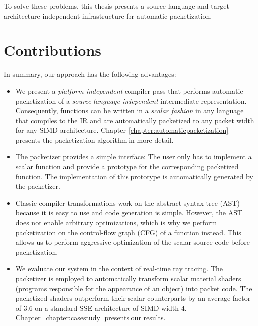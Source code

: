 To solve these problems, this thesis presents a source-language and target-architecture independent infrastructure for automatic packetization.

\section{Contributions}
\label{sec:introduction:contributions}

In summary, our approach has the following advantages:
\begin{itemize}
    \item
        We present a \emph{platform-independent} compiler pass that performs automatic packetization of a \emph{source-language independent} intermediate representation.
        Consequently, functions can be written in a \emph{scalar fashion} in any language that compiles to the IR and are automatically packetized to any packet width for any SIMD architecture.
        Chapter~\ref{chapter:automaticpacketization} presents the packetization algorithm in more detail.
	\item
        The packetizer provides a simple interface:
		The user only has to implement a scalar function and provide a prototype for the corresponding packetized function. %
		The implementation of this prototype is automatically generated by the packetizer.
    \item
        Classic compiler transformations work on the abstract syntax tree (AST) because it is easy to use and code generation is simple.
        However, the AST does not enable arbitrary optimizations, which is why we perform packetization on the control-flow graph (CFG) of a function instead.
        This allows us to perform aggressive optimization of the scalar source code before packetization.
    \item
        We evaluate our system in the context of real-time ray tracing.
        The packetizer is employed to automatically transform scalar material shaders (programs responsible for the appearance of an object) into packet code.
        The packetized shaders outperform their scalar counterparts by an average factor of 3.6 on a standard SSE architecture of SIMD width 4.
        Chapter~\ref{chapter:casestudy} presents our results.
\end{itemize}
